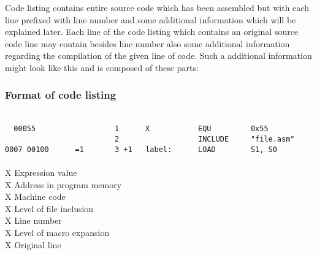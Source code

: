         Code listing contains entire source code which has been assembled but with each line prefixed with line number and some additional information which will be explained later. Each line of the code listing which contains an original source code line may contain besides line number also some additional information regarding the compilation of the given line of code. Such a additional information might look like this and is composed of these parts:

        \subsubsection{Format of code listing}
            ~\\
            \verb'  '{\color{highlight_lst_number}\verb'00055'}\verb'                  '{\color{highlight_lst_line}\verb'1'}\verb'      '{\color{highlight_comment}\verb'X           EQU         0x55'}\\
            \verb'                         '{\color{highlight_lst_line}\verb'2'}\verb'      '{\color{highlight_comment}\verb'            INCLUDE     "file.asm"'}\\
            {\color{highlight_lst_address}\verb'0007'}\verb' '{\color{highlight_lst_code}\verb'00100'}\verb'      '{\color{highlight_label}\verb'=1'}\verb'       '{\color{highlight_lst_line}\verb'3'}\verb' '{\color{highlight_constant}\verb'+1'}\verb'   '{\color{highlight_comment}\verb'label:      LOAD        S1, S0'}\\
            ~\\
            \colorbox{highlight_lst_number}{\color{highlight_lst_number}X} Expression value\\
            \colorbox{highlight_lst_address}{\color{highlight_lst_address}X} Address in program memory\\
            \colorbox{highlight_lst_code}{\color{highlight_lst_code}X} Machine code\\
            \colorbox{highlight_label}{\color{highlight_label}X} Level of file inclusion\\
            \colorbox{highlight_lst_line}{\color{highlight_lst_line}X} Line number\\
            \colorbox{highlight_constant}{\color{highlight_constant}X} Level of macro expansion\\
            \colorbox{highlight_comment}{\color{highlight_comment}X} Original line

        \clearpage
